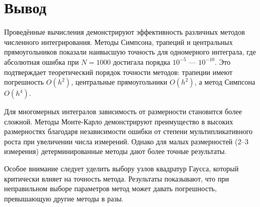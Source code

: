\documentclass[a4paper]{article}
\begin{document}
\section*{\centering\fontsize{14pt}{0pt}\selectfont\textbf{Вывод}\label{sec:conclusion}}

Проведённые вычисления демонстрируют эффективность различных методов численного интегрирования. Методы Симпсона, трапеций и центральных прямоугольников показали наивысшую точность для одномерного интеграла, где абсолютная ошибка при $N=1000$ достигала порядка $10^{-5}$ — $10^{-10}$. Это подтверждает теоретический порядок точности методов: трапеции имеют погрешность $O(h^2)$, центральные прямоугольники $O(h^2)$, а метод Симпсона $O(h^4)$.

Для многомерных интегралов зависимость от размерности становится более сложной. Методы Монте-Карло демонстрируют преимущество в высоких размерностях благодаря независимости ошибки от степени мультипликативного роста при увеличении числа измерений. Однако для малых размерностей (2–3 измерения) детерминированные методы дают более точные результаты.

Особое внимание следует уделить выбору узлов квадратур Гаусса, который критически влияет на точность метода. Результаты показывают, что при неправильном выборе параметров метод может давать погрешность, превышающую другие методы в разы.
\end{document}
